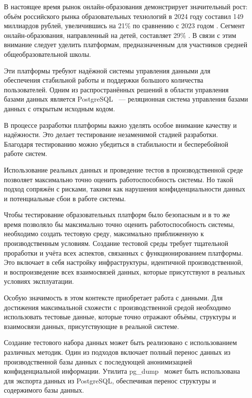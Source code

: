 \introduction %

В настоящее время рынок онлайн-образования демонстрирует значительный рост: объём российского рынка образовательных технологий в 2024 году составил 149 миллиардов рублей, увеличившись на 21\% по сравнению с 2023 годом \cite{online-edu}. Сегмент онлайн-образования, направленный на детей, составляет 29\% \cite{online-edu-child}. В связи с этим внимание следует уделить платформам, предназначенным для участников средней общеобразовательной школы.

Эти платформы требуют надёжной системы управления данными для обеспечения стабильной работы и поддержки большого количества пользователей. Одним из распространённых решений в области управления базами данных является PostgreSQL~\cite{postgresql} — реляционная система управления базами данных с открытым исходным кодом.

В процессе разработки платформы важно уделять особое внимание качеству и надёжности. Это делает тестирование незаменимой стадией разработки. Благодаря тестированию можно убедиться в стабильности и бесперебойной работе систем.

Использование реальных данных и проведение тестов в производственной среде позволяет максимально точно оценить работоспособность системы. Но такой подход сопряжён с рисками, такими как нарушения конфиденциальности данных и потенциальные сбои в работе системы.

Чтобы тестирование образовательных платформ было безопасным и в то же время позволяло бы максимально точно оценить работоспособность системы, необходимо создать тестовую среду, максимально приближенную к производственным условиям. Создание тестовой среды требует тщательной проработки и учёта всех аспектов, связанных с функционированием платформы. Это включает в себя настройку инфраструктуры, идентичной производственной, и воспроизведение всех взаимосвязей данных, которые присутствуют в реальных условиях эксплуатации.

Особую значимость в этом контексте приобретает работа с данными. Для достижения максимальной схожести с производственной средой необходимо использовать тестовые данные, которые точно отражают объёмы, структуры и взаимосвязи данных, присутствующие в реальной системе.

Создание тестового набора данных может быть реализовано с использованием различных методик. Один из подходов включает полный перенос данных из производственной базы данных с последующей анонимизацией конфиденциальной информации. Утилита pg\_dump~\cite{pg-dump} может быть использована для экспорта данных из PostgreSQL, обеспечивая перенос структуры и содержимого базы данных.

